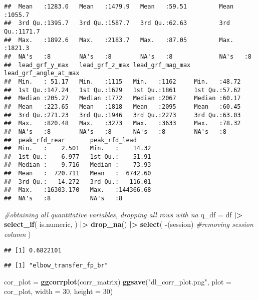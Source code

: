 \documentclass[
]{article}
\newenvironment{Shaded}{\begin{snugshade}}{\end{snugshade}}
\newcommand{\AttributeTok}[1]{\textcolor[rgb]{0.13,0.29,0.53}{#1}}
\newcommand{\CommentTok}[1]{\textcolor[rgb]{0.56,0.35,0.01}{\textit{#1}}}
\newcommand{\DecValTok}[1]{\textcolor[rgb]{0.00,0.00,0.81}{#1}}
\newcommand{\FunctionTok}[1]{\textcolor[rgb]{0.13,0.29,0.53}{\textbf{#1}}}
\newcommand{\NormalTok}[1]{#1}
\newcommand{\OtherTok}[1]{\textcolor[rgb]{0.56,0.35,0.01}{#1}}
\newcommand{\SpecialCharTok}[1]{\textcolor[rgb]{0.81,0.36,0.00}{\textbf{#1}}}
\newcommand{\StringTok}[1]{\textcolor[rgb]{0.31,0.60,0.02}{#1}}
\begin{document}
\begin{verbatim}
##  Mean   :1283.0   Mean   :1479.9   Mean   :59.51         Mean   :1055.7  
##  3rd Qu.:1395.7   3rd Qu.:1587.7   3rd Qu.:62.63         3rd Qu.:1171.7  
##  Max.   :1892.6   Max.   :2183.7   Max.   :87.05         Max.   :1821.3  
##  NA's   :8        NA's   :8        NA's   :8             NA's   :8       
##  lead_grf_y_max   lead_grf_z_max lead_grf_mag_max lead_grf_angle_at_max
##  Min.   : 51.17   Min.   :1115   Min.   :1162     Min.   :48.72        
##  1st Qu.:147.24   1st Qu.:1629   1st Qu.:1861     1st Qu.:57.62        
##  Median :205.27   Median :1772   Median :2067     Median :60.17        
##  Mean   :223.65   Mean   :1818   Mean   :2095     Mean   :60.45        
##  3rd Qu.:271.23   3rd Qu.:1946   3rd Qu.:2273     3rd Qu.:63.03        
##  Max.   :820.48   Max.   :3273   Max.   :3633     Max.   :78.32        
##  NA's   :8        NA's   :8      NA's   :8        NA's   :8            
##  peak_rfd_rear       peak_rfd_lead      
##  Min.   :    2.501   Min.   :    14.32  
##  1st Qu.:    6.977   1st Qu.:    51.91  
##  Median :    9.716   Median :    73.93  
##  Mean   :  720.711   Mean   :  6742.60  
##  3rd Qu.:   14.272   3rd Qu.:   116.01  
##  Max.   :16303.170   Max.   :144366.68  
##  NA's   :8           NA's   :8
\end{verbatim}

\begin{Shaded}
\begin{Highlighting}[]
\CommentTok{\#obtaining all quantitative variables, dropping all rows with na}
\NormalTok{q\_df }\OtherTok{=}\NormalTok{ df }\SpecialCharTok{|\textgreater{}}
  \FunctionTok{select\_if}\NormalTok{(}
\NormalTok{    is.numeric, }
\NormalTok{  ) }\SpecialCharTok{|\textgreater{}}
  \FunctionTok{drop\_na}\NormalTok{() }\SpecialCharTok{|\textgreater{}}
  \FunctionTok{select}\NormalTok{(}
    \SpecialCharTok{{-}}\NormalTok{(session) }\CommentTok{\#removing session column}
\NormalTok{  )}
\end{Highlighting}
\end{Shaded}

\begin{verbatim}
## [1] 0.6822101
\end{verbatim}

\begin{verbatim}
## [1] "elbow_transfer_fp_br"
\end{verbatim}

\begin{Shaded}
\begin{Highlighting}[]
\NormalTok{cor\_plot }\OtherTok{=} \FunctionTok{ggcorrplot}\NormalTok{(corr\_matrix) }
\FunctionTok{ggsave}\NormalTok{(}\StringTok{"dl\_corr\_plot.png"}\NormalTok{, }\AttributeTok{plot =}\NormalTok{ cor\_plot, }\AttributeTok{width =} \DecValTok{30}\NormalTok{, }\AttributeTok{height =} \DecValTok{30}\NormalTok{)}
\end{Highlighting}
\end{Shaded}
\end{document}
